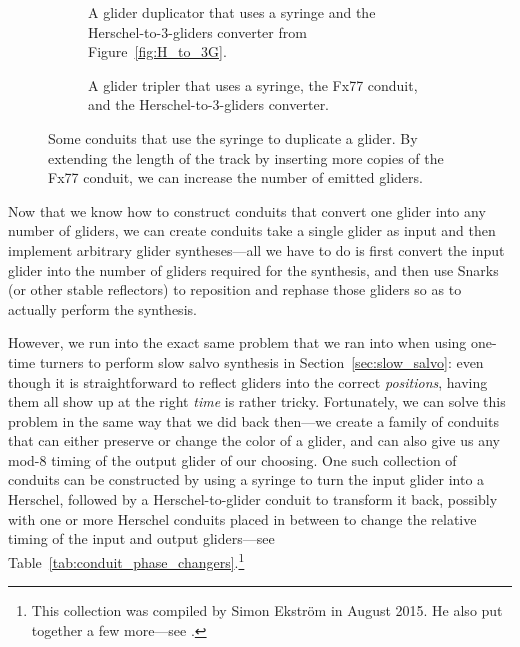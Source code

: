 \begin{figure}[!htb]
	\centering
	\begin{subfigure}{.38\textwidth}
		\centering
		\caption{A glider duplicator that uses a syringe and the Herschel-to-$3$-gliders converter from Figure~\ref{fig:H_to_3G}.}\label{fig:glider_duplicator}
	\end{subfigure} \hfill %
	\begin{subfigure}{.58\textwidth}
		\centering
		\caption{A glider tripler that uses a syringe, the Fx77 conduit, and the Herschel-to-$3$-gliders converter.}
		\label{fig:glider_tripler}
	\end{subfigure}
	\caption{Some conduits that use the syringe to duplicate a glider. By extending the length of the track by inserting more copies of the Fx77 conduit, we can increase the number of emitted gliders.}\label{fig:glider_multipliers}
\end{figure}

Now that we know how to construct conduits that convert one glider into any number of gliders, we can create conduits take a single glider as input and then implement arbitrary glider syntheses---all we have to do is first convert the input glider into the number of gliders required for the synthesis, and then use Snarks (or other stable reflectors) to reposition and rephase those gliders so as to actually perform the synthesis.

However, we run into the exact same problem that we ran into when using one-time turners to perform slow salvo synthesis in Section~\ref{sec:slow_salvo}: even though it is straightforward to reflect gliders into the correct \emph{positions}, having them all show up at the right \emph{time} is rather tricky. Fortunately, we can solve this problem in the same way that we did back then---we create a family of conduits that can either preserve or change the color of a glider, and can also give us any mod-$8$ timing of the output glider of our choosing. One such collection of conduits can be constructed by using a syringe to turn the input glider into a Herschel, followed by a Herschel-to-glider conduit to transform it back, possibly with one or more Herschel conduits placed in between to change the relative timing of the input and output gliders---see Table~\ref{tab:conduit_phase_changers}.\footnote{This collection was compiled by Simon Ekstr\"{o}m in August 2015. He also put together a few more---see .}

